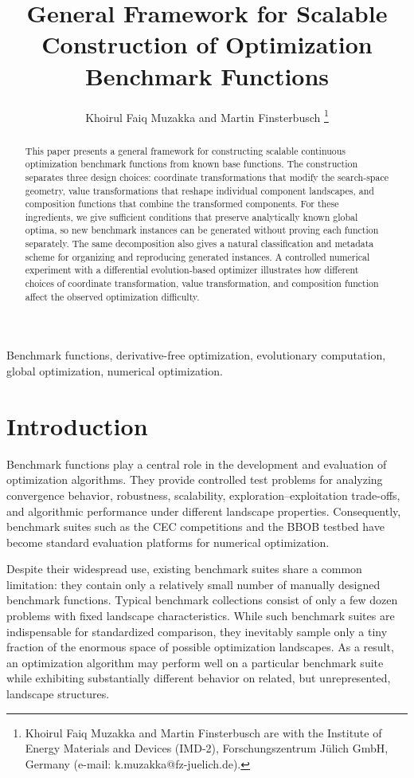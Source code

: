\documentclass[journal]{IEEEtran}
\title{General Framework for Scalable Construction of Optimization Benchmark Functions}
\author{
	Khoirul Faiq Muzakka and Martin Finsterbusch%
	\thanks{Khoirul Faiq Muzakka and Martin Finsterbusch are with the
	Institute of Energy Materials and Devices (IMD-2), Forschungszentrum
	J\"ulich GmbH, Germany (e-mail: k.muzakka@fz-juelich.de).}
}
\theoremstyle{remark}
\theoremstyle{plain}
\begin{document}
\maketitle

\begin{abstract}
This paper presents a general framework for constructing scalable continuous
optimization benchmark functions from known base functions. The construction
separates three design choices: coordinate transformations that modify the
search-space geometry, value transformations that reshape individual component
landscapes, and composition functions that combine the transformed components.
For these ingredients, we give sufficient conditions that preserve analytically
known global optima, so new benchmark instances can be generated without
proving each function separately. The same decomposition also gives a natural
classification and metadata scheme for organizing and reproducing generated
instances. A controlled numerical experiment with a differential
evolution-based optimizer illustrates how different choices of coordinate
transformation, value transformation, and composition function affect the
observed optimization difficulty.
\end{abstract}

\begin{IEEEkeywords}
Benchmark functions, derivative-free optimization, evolutionary computation,
global optimization, numerical optimization.
\end{IEEEkeywords}


\section{Introduction}
\label{sec:introduction}

Benchmark functions play a central role in the development and evaluation of
optimization algorithms. They provide controlled test problems for analyzing
convergence behavior, robustness, scalability, exploration--exploitation
trade-offs, and algorithmic performance under different landscape properties.
Consequently, benchmark suites such as the CEC competitions\cite{cec2017, cec2020, cec2022} and the BBOB
testbed\cite{Hansen2009BBOBFunctions} have become standard evaluation platforms for numerical optimization.

Despite their widespread use, existing benchmark suites share a common
limitation: they contain only a relatively small number of manually designed
benchmark functions. Typical benchmark collections consist of only a few dozen
problems with fixed landscape characteristics. While such benchmark suites are
indispensable for standardized comparison, they inevitably sample only a tiny
fraction of the enormous space of possible optimization landscapes. As a
result, an optimization algorithm may perform well on a particular benchmark
suite while exhibiting substantially different behavior on related, but
unrepresented, landscape structures\cite{PIOTROWSKI2023101378}.
\end{document}
